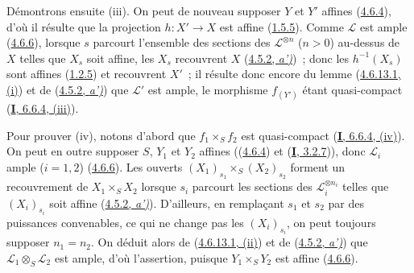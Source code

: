 Démontrons ensuite (iii). On peut de nouveau supposer $Y$ et $Y'$ affines
(\hyperref[II.4.6.4-fr]{4.6.4}), d'où il résulte que la projection
$h:X'\to X$ est affine (\hyperref[II.1.5.5-fr]{1.5.5}). Comme
$\mathcal{L}$ est ample (\hyperref[II.4.6.6-fr]{4.6.6}), lorsque $s$
parcourt l'ensemble des sections des $\mathcal{L}^{\otimes n}$ ($n>0$)
au-dessus de $X$ telles que $X_s$ soit affine, les $X_s$ recouvrent $X$
(\hyperref[II.4.5.2-fr]{4.5.2, \emph{a')}})~; donc les $h^{-1}(X_s)$ sont affines
(\hyperref[II.1.2.5-fr]{1.2.5}) et recouvrent $X'$~; il résulte donc encore
du lemme (\hyperref[II.4.6.13.1-fr]{4.6.13.1, (i)}) et de
(\hyperref[II.4.5.2-fr]{4.5.2, \emph{a')}}) que $\mathcal{L}'$ est ample, le
morphisme $f_{(Y')}$ étant quasi-compact
(\hyperref[I.6.6.4-fr]{\textbf{I}, 6.6.4, (iii)}).

Pour prouver (iv), notons d'abord que $f_1\times_S f_2$ est quasi-compact
(\hyperref[I.6.6.4-fr]{\textbf{I}, 6.6.4, (iv)}). On peut en outre supposer $S$,
$Y_1$ et $Y_2$ affines ((\hyperref[II.4.6.4-fr]{4.6.4}) et
(\hyperref[I.3.2.7-fr]{\textbf{I}, 3.2.7})), donc $\mathcal{L}_i$ ample ($i=1,2$)
(\hyperref[II.4.6.6-fr]{4.6.6}). Les ouverts
$(X_1)_{s_1}\times_S(X_2)_{s_2}$ forment un recouvrement de
$X_1\times_S X_2$ lorsque $s_i$ parcourt les sections des
$\mathcal{L}_i^{\otimes n_i}$ telles que $(X_i)_{s_i}$ soit affine
(\hyperref[II.4.5.2-fr]{4.5.2, \emph{a')}}). D'ailleurs, en remplaçant $s_1$ et
$s_2$ par des puissances convenables, ce qui ne change pas les
$(X_i)_{s_i}$, on peut toujours supposer $n_1=n_2$. On déduit alors de
(\hyperref[II.4.6.13.1-fr]{4.6.13.1, (ii)}) et de
(\hyperref[II.4.5.2-fr]{4.5.2, \emph{a')}}) que
$\mathcal{L}_1\otimes_S\mathcal{L}_2$ est ample, d'où l'assertion, puisque
$Y_1\times_S Y_2$ est affine (\hyperref[II.4.6.6-fr]{4.6.6}).

